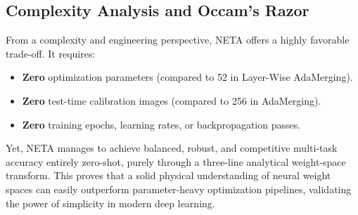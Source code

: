 \subsection{Complexity Analysis and Occam's Razor}
From a complexity and engineering perspective, NETA offers a highly favorable trade-off. It requires:
\begin{itemize}
    \item \textbf{Zero} optimization parameters (compared to 52 in Layer-Wise AdaMerging).
    \item \textbf{Zero} test-time calibration images (compared to 256 in AdaMerging).
    \item \textbf{Zero} training epochs, learning rates, or backpropagation passes.
\end{itemize}
Yet, NETA manages to achieve balanced, robust, and competitive multi-task accuracy entirely zero-shot, purely through a three-line analytical weight-space transform. This proves that a solid physical understanding of neural weight spaces can easily outperform parameter-heavy optimization pipelines, validating the power of simplicity in modern deep learning.
